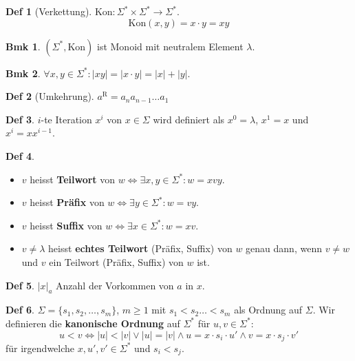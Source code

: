 \documentclass[a4paper, 10pt]{article}
\theoremstyle{definition}
\newtheorem{definition}{Def}[section]
\newtheorem{note}{Bmk}[section]
\newcommand{\words}{\Sigma^*}
\newcommand{\A}{\Sigma}
\newcommand{\Kon}{\text{Kon}}
\begin{document}
\begin{definition}[Verkettung]
    \(\Kon: \words \times \words \to \words\).
    \[\Kon(x, y) = x \cdot y = xy\]
\end{definition}

\begin{note}
\((\words, \Kon)\) ist Monoid mit neutralem Element $\lambda$.
\end{note}

\begin{note}
    \(\forall x,y \in \words: |xy| = |x \cdot y| = |x| + |y|\).
\end{note}

\begin{definition}[Umkehrung]
    \(a^\text{R} = a_na_{n-1} \ldots a_1\)
\end{definition}

\begin{definition}
    \(i\)-te Iteration \(x^i\) von \(x \in \A\) wird definiert als \(x^0 = \lambda\), \(x^1 = x\) und \(x^i = xx^{i-1}\).
\end{definition}

\begin{definition}\(\;\)
    \begin{itemize}
        \item \(v\) heisst \textbf{Teilwort} von \(w \iff \exists x,y \in \words: w = xvy\).
        \item \(v\) heisst \textbf{Präfix} von \(w \iff \exists y \in \words: w = vy\).
        \item \(v\) heisst \textbf{Suffix} von \(w \iff \exists x \in \words: w = xv\).
        \item \(v \neq \lambda\) heisst \textbf{echtes Teilwort} (Präfix, Suffix) von \(w\) genau dann, wenn \(v \neq w\) und \(v\) ein Teilwort (Präfix, Suffix) von \(w\) ist.
    \end{itemize}
\end{definition}

\begin{definition}
    \(|x|_a\) Anzahl der Vorkommen von \(a\) in \(x\).
\end{definition}

\begin{definition}
    \(\A = \{s_1, s_2, \ldots, s_m\}\), \(m \geq 1\) mit \(s_1 < s_2 \ldots < s_m\) als Ordnung auf \(\A\). Wir definieren die \textbf{kanonische Ordnung} auf \(\words\) für \(u, v \in \words\):
    \[u < v \iff |u| < |v| \lor |u| = |v| \land u = x \cdot s_i \cdot u' \land v = x \cdot s_j \cdot v'\] für irgendwelche \(x, u', v' \in \words\) und \(s_i < s_j\).
\end{definition}
\end{document}
